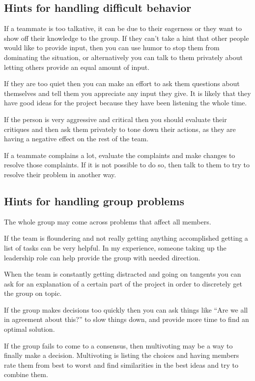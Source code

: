 \documentclass[
10pt, %
a4paper, %
oneside, %
headinclude,footinclude, %
BCOR5mm, %
]{scrartcl}
\begin{document}
\subsection{Hints for handling difficult behavior}

If a teammate is too talkative, it can be due to their eagerness or they
want to show off their knowledge to the group. If they can't take a hint
that other people would like to provide input, then you can use humor to
stop them from dominating the situation, or alternatively you can talk
to them privately about letting others provide an equal amount of input.

If they are too quiet then you can make an effort to ask them questions
about themselves and tell them you appreciate any input they give. It is
likely that they have good ideas for the project because they have been
listening the whole time.

If the person is very aggressive and critical then you should evaluate
their critiques and then ask them privately to tone down their actions,
as they are having a negative effect on the rest of the team.

If a teammate complains a lot, evaluate the complaints and make changes
to resolve those complaints. If it is not possible to do so, then talk
to them to try to resolve their problem in another way.

\subsection{Hints for handling group problems}

The whole group may come across problems that affect all members.

If the team is floundering and not really getting anything accomplished
getting a list of tasks can be very helpful. In my experience, someone
taking up the leadership role can help provide the group with needed
direction.

When the team is constantly getting distracted and going on tangents you
can ask for an explanation of a certain part of the project in order to
discretely get the group on topic.

If the group makes decisions too quickly then you can ask things like
``Are we all in agreement about this?'' to slow things down, and provide
more time to find an optimal solution.

If the group fails to come to a consensus, then multivoting may be a way
to finally make a decision. Multivoting is listing the choices and
having members rate them from best to worst and find similarities in the
best ideas and try to combine them.
\end{document}
